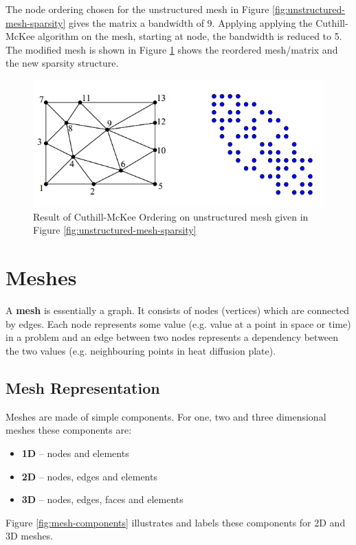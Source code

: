 \documentclass{article}
\begin{document}
The node ordering chosen for the unstructured mesh in Figure \ref{fig:unstructured-mesh-sparsity} gives the matrix a bandwidth of 9. Applying applying the Cuthill-McKee algorithm on the mesh, starting at node, the bandwidth is reduced to 5. The modified mesh is shown in Figure \ref{fig:cuthill-mckee-reordering} shows the reordered mesh/matrix and the new sparsity structure.

\begin{figure}
	\centering
	\includegraphics[scale=0.7]{figures/cuthill-mckee-reordering.png}
	\caption{Result of Cuthill-McKee Ordering on unstructured mesh given in Figure \ref{fig:unstructured-mesh-sparsity}}
	\label{fig:cuthill-mckee-reordering}
\end{figure}

\section{Meshes}

A \textbf{mesh} is essentially a graph. It consists of nodes (vertices) which are connected by edges. Each node represents some value (e.g. value at a point in space or time) in a problem and an edge between two nodes represents a dependency between the two values (e.g. neighbouring points in heat diffusion plate).

\subsection{Mesh Representation}
\label{sec:mesh-representation}

Meshes are made of simple components. For one, two and three dimensional meshes these components are:
\begin{itemize}
	\item \textbf{1D} -- nodes and elements
	\item \textbf{2D} -- nodes, edges and elements
	\item \textbf{3D} -- nodes, edges, faces and elements
\end{itemize}
Figure \ref{fig:mesh-components} illustrates and labels these components for 2D and 3D meshes.
\end{document}
